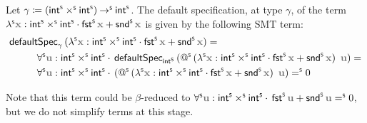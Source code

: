 \begin{example}
  \begin{samepage}
  Let $\gamma \coloneq (\mathsf{int}^{\scriptscriptstyle{\mathsf{S}}} \mathbin{\times^{\scriptscriptstyle{\mathsf{S}}}} \mathsf{int}^{\scriptscriptstyle{\mathsf{S}}}) \mathbin{\to^{\scriptscriptstyle{\mathsf{S}}}} \mathsf{int}^{\scriptscriptstyle{\mathsf{S}}}$. The default specification, at type $\gamma$, of the term \(\lamS \var{x} : \intS \timesS \intS \cdot \fstS \var{x} +  \sndS \var{x}\) is given by the following SMT term:
  \[
  \begin{aligned}
  &\mathsf{defaultSpec}_{\gamma}\left(\lamS \var{x} : \intS \timesS \intS \cdot \fstS \var{x} +  \sndS \var{x}\right) = \\
  &\mkern50mu \forallS \var{u} : \intS \timesS \intS\cdot\, \mathsf{defaultSpec}_{\intS} \left( \appS{\left(\lamS \var{x} : \intS \timesS \intS \cdot \fstS \var{x} +  \sndS \var{x}\right)}{\var{u}}\right) =\\
  &\mkern50mu \forallS \var{u} : \intS \timesS \intS\cdot\, \left(\appS{\left(\lamS \var{x} : \intS \timesS \intS \cdot \fstS \var{x} +  \sndS \var{x}\right)}{\var{u}}\right) \eqS 0
  \end{aligned}
  \]

  Note that this term could be $\beta$-reduced to \(\forallS \var{u} : \intS \timesS \intS\cdot\, \fstS \var{u} +  \sndS \var{u} \eqS 0\), but we do not simplify terms at this stage.
  \end{samepage}
\end{example}

